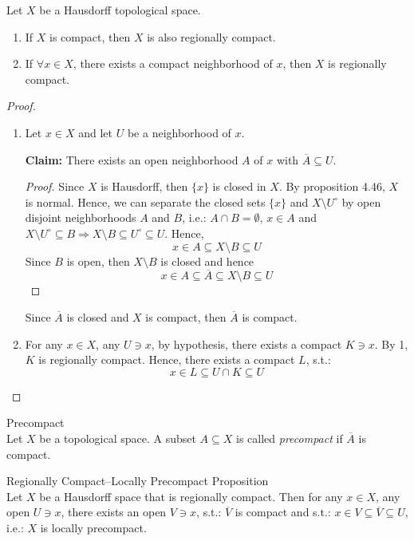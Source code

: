 \begin{proposition}
    Let $X$ be a Hausdorff topological space.
    \begin{enumerate}
        \item If $X$ is compact, then $X$ is also regionally compact.
        \item If $\forall x \in X$, there exists a compact neighborhood of $x$, then $X$ is regionally compact.
    \end{enumerate}
\end{proposition}

\begin{proof}
    \begin{enumerate}
        \item Let $x \in X$ and let $U$ be a neighborhood of $x$.

        \noindent\textbf{Claim:} There exists an open neighborhood $A$ of $x$ with $\overline{A} \subseteq U$.
        \begin{proof}
            Since $X$ is Hausdorff, then $\{x\}$ is closed in $X$. By proposition 4.46, $X$ is normal. Hence, we can separate the closed sets $\{x\}$ and $X \setminus U^\circ$ by open disjoint neighborhoods $A$ and $B$, i.e.: $A \cap B =\emptyset$, $x \in A$ and $X \setminus U^\circ \subseteq B \Rightarrow X \setminus B \subseteq U^\circ \subseteq U$. Hence, 
            $$x \in A \subseteq X \setminus B \subseteq U$$
            Since $B$ is open, then $X \setminus B$ is closed and hence 
            $$x \in A \subseteq \overline{A} \subseteq X \setminus B \subseteq U$$
        \end{proof}
        Since $\overline{A}$ is closed and $X$ is compact, then $\overline{A}$ is compact.

        \item For any $x \in X$, any $U \ni x$, by hypothesis, there exists a compact $K \ni x$. By 1, $K$ is regionally compact. Hence, there exists a compact $L$, s.t.: 
        $$x \in L \subseteq U \cap K \subseteq U$$
    \end{enumerate}
\end{proof}

\begin{definition}{Precompact}\\
Let $X$ be a topological space. A subset $A \subseteq X$ is called \textit{precompact} if $\overline{A}$ is compact.
\end{definition}

\begin{proposition}{Regionally Compact–Locally Precompact Proposition}\\
Let $X$ be a Hausdorff space that is regionally compact. Then for any $x \in X$, any open $U \ni x$, there exists an open $V \ni x$, s.t.: $\overline{V}$ is compact and s.t.: $x \in V \subseteq \overline{V} \subseteq U$, i.e.: $X$ is locally precompact.
\end{proposition}

